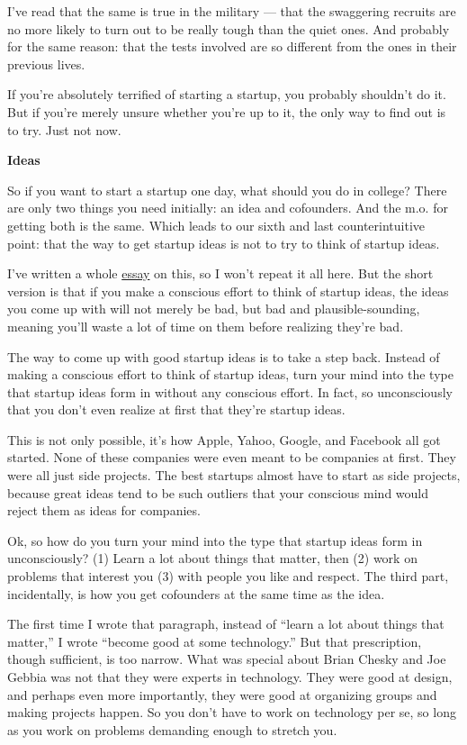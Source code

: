 I've read that the same is true in the military --- that the swaggering
recruits are no more likely to turn out to be really tough than the
quiet ones. And probably for the same reason: that the tests involved
are so different from the ones in their previous lives.

If you're absolutely terrified of starting a startup, you probably
shouldn't do it. But if you're merely unsure whether you're up to it,
the only way to find out is to try. Just not now.

\textbf{Ideas}

So if you want to start a startup one day, what should you do in
college? There are only two things you need initially: an idea and
cofounders. And the m.o. for getting both is the same. Which leads to
our sixth and last counterintuitive point: that the way to get startup
ideas is not to try to think of startup ideas.

I've written a whole \href{startupideas.html}{essay} on this, so I won't
repeat it all here. But the short version is that if you make a
conscious effort to think of startup ideas, the ideas you come up with
will not merely be bad, but bad and plausible-sounding, meaning you'll
waste a lot of time on them before realizing they're bad.

The way to come up with good startup ideas is to take a step back.
Instead of making a conscious effort to think of startup ideas, turn
your mind into the type that startup ideas form in without any conscious
effort. In fact, so unconsciously that you don't even realize at first
that they're startup ideas.

This is not only possible, it's how Apple, Yahoo, Google, and Facebook
all got started. None of these companies were even meant to be companies
at first. They were all just side projects. The best startups almost
have to start as side projects, because great ideas tend to be such
outliers that your conscious mind would reject them as ideas for
companies.

Ok, so how do you turn your mind into the type that startup ideas form
in unconsciously? (1) Learn a lot about things that matter, then (2)
work on problems that interest you (3) with people you like and respect.
The third part, incidentally, is how you get cofounders at the same time
as the idea.

The first time I wrote that paragraph, instead of ``learn a lot about
things that matter,'' I wrote ``become good at some technology.'' But
that prescription, though sufficient, is too narrow. What was special
about Brian Chesky and Joe Gebbia was not that they were experts in
technology. They were good at design, and perhaps even more importantly,
they were good at organizing groups and making projects happen. So you
don't have to work on technology per se, so long as you work on problems
demanding enough to stretch you.


